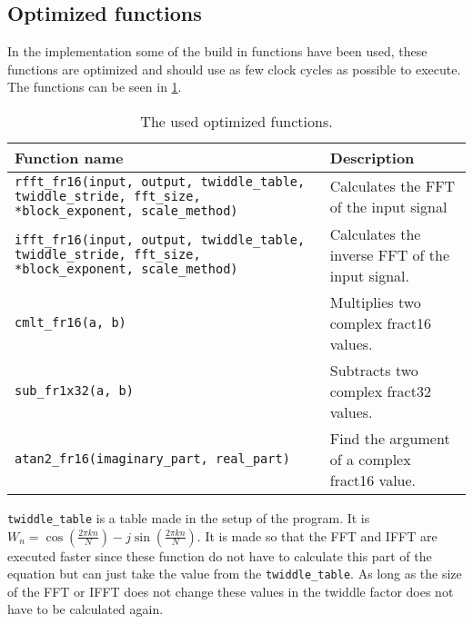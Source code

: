 \subsection{Optimized functions}
In the implementation some of the build in functions have been used, these functions are optimized and should use as few clock cycles as possible to execute. The functions can be seen in \cref{tab:optimized_func}.

\begin{table}
	\centering
	\begin{tabularx}{\textwidth}{X X}
		\toprule
		\textbf{Function name} & \textbf{Description }\\
		\midrule
		\texttt{rfft_fr16(input, output, twiddle_table, twiddle_stride, fft_size, *block_exponent, scale_method)} & Calculates the FFT of the input signal\\
		\texttt{ifft_fr16(input, output, twiddle_table, twiddle_stride, fft_size, *block_exponent, scale_method)} & Calculates the inverse FFT of the input signal. \\
		\texttt{cmlt_fr16(a, b)} & Multiplies two complex fract16 values. \\
		\texttt{sub_fr1x32(a, b)}& Subtracts two complex fract32 values. \\
		\texttt{atan2_fr16(imaginary_part, real_part)} & Find the argument of a complex fract16 value. \\
		\bottomrule
	\end{tabularx}
	\caption{The used optimized functions.}
	\label{tab:optimized_func}
\end{table}

\texttt{twiddle_table} is a table made in the setup of the program.
It is $W_n = \cos(\frac{2\pi kn}{N})-j\sin(\frac{2\pi kn}{N})$.
It is made so that the FFT and IFFT are executed faster since these function do not have to calculate this part of the equation but can just take the value from the \texttt{twiddle_table}.
As long as the size of the FFT or IFFT does not change these values in the twiddle factor does not have to be calculated again.

\FloatBarrier
